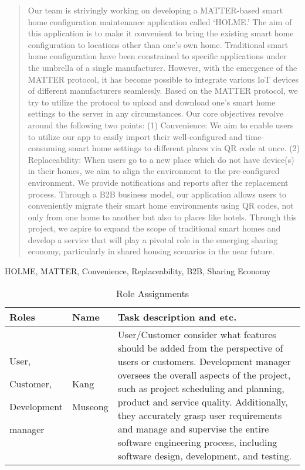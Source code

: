 \documentclass[conference]{IEEEtran}
\begin{document}
\begin{abstract}
Our team is strivingly working on developing a MATTER-based smart home configuration maintenance application called `HOLME.' The aim of this application is to make it convenient to bring the existing smart home configuration to locations other than one's own home.
Traditional smart home configuration have been constrained to specific applications under the umbrella of a single manufacturer. However, with the emergence of the MATTER protocol, it has become possible to integrate various IoT devices of different manufacturers seamlessly. Based on the MATTER protocol, we try to utilize the protocol to upload and download one's smart home settings to the server in any circumstances.
Our core objectives revolve around the following two points: (1) Convenience: We aim to enable users to utilize our app to easily import their well-configured and time-consuming smart home settings  to different places via QR code at once.
(2) Replaceability: When users go to a new place which do not have device(s) in their homes, we aim to align the environment to the pre-configured environment. We provide notifications and reports after the replacement process.
Through a B2B business model, our application allows users to conveniently migrate their smart home environments using QR codes, not only from one home to another but also to places like hotels.
Through this project, we aspire to expand the scope of traditional smart homes and develop a service that will play a pivotal role in the emerging sharing economy, particularly in shared housing scenarios in the near future.
\end{abstract}

\begin{IEEEkeywords}
HOLME, MATTER, Convenience, Replaceability, B2B, Sharing Economy
\end{IEEEkeywords}

\begin{table}[h]
\caption{Role Assignments}
\def\arraystretch{1.24} \small
    \begin{tabular}{|p{1.8cm}|p{1.4cm}|p{4.4cm}|}
        \hline
        Roles & Name & Task description and etc. \\ \hline
         User, \par Customer, \par Development \par manager & Kang \par Museong &User/Customer consider what features should be added from the perspective of users or customers. Development manager oversees the overall aspects of the project, such as project scheduling and planning, product and service quality. Additionally, they accurately grasp user requirements and manage and supervise the entire software engineering process, including software design, development, and testing. \\ \hline

	\end{tabular}
\end{table}
\end{document}
